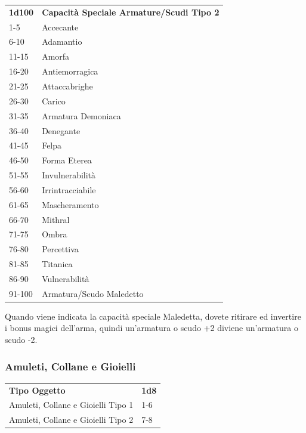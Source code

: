 \begin{multicols}{2}
\begin{tabularx}{0.45\textwidth}{lX}
\textbf{1d100} & \textbf{Capacità Speciale Armature/Scudi Tipo 2}\\
1-5 &Accecante\\
6-10 &Adamantio\\
11-15& Amorfa\\
16-20& Antiemorragica\\
21-25& Attaccabrighe\\
26-30& Carico\\
31-35& Armatura Demoniaca\\
36-40& Denegante\\
41-45& Felpa\\
46-50& Forma Eterea\\
51-55& Invulnerabilità\\
56-60& Irrintracciabile\\
61-65 &Mascheramento\\
66-70 &Mithral\\
71-75 &Ombra\\
76-80 &Percettiva\\
81-85 &Titanica\\
86-90 &Vulnerabilità\\
91-100& Armatura/Scudo Maledetto\\
\end{tabularx}

\medskip

Quando viene indicata la capacità speciale Maledetta, dovete ritirare ed invertire i bonus magici dell'arma, quindi un'armatura o scudo +2 diviene un'armatura o scudo -2.

\subsubsection{Amuleti, Collane e Gioielli}


\begin{tabular}{ll}
\textbf{Tipo Oggetto}&\textbf{1d8}\\
Amuleti, Collane e Gioielli Tipo 1&1-6\\
Amuleti, Collane e Gioielli Tipo 2&7-8\\
\end{tabular}

\medskip


\end{multicols}
